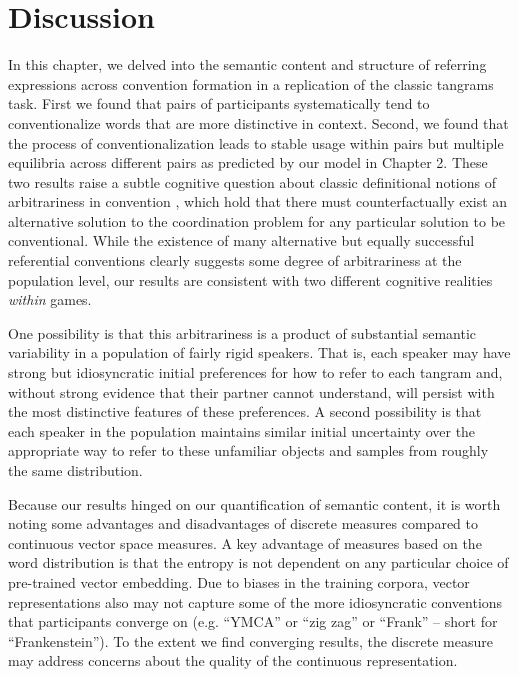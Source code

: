 %


\section{Discussion}\label{general-discussion}

In this chapter, we delved into the semantic content and structure of referring expressions across convention formation in a replication of the classic tangrams task.
First we found that pairs of participants systematically tend to conventionalize words that are more distinctive in context. 
Second, we found that the process of conventionalization leads to stable usage within pairs but multiple equilibria across different pairs as predicted by our model in Chapter 2.
These two results raise a subtle cognitive question about classic definitional notions of arbitrariness in convention \cite{Lewis69_Convention}, which hold that there must counterfactually exist an alternative solution to the coordination problem for any particular solution to be conventional.
While the existence of many alternative but equally successful referential conventions clearly suggests some degree of arbitrariness at the population level, our results are consistent with two different cognitive realities \emph{within} games.

One possibility is that this arbitrariness is a product of substantial semantic variability in a population of fairly rigid speakers.
That is, each speaker may have strong but idiosyncratic initial preferences for how to refer to each tangram and, without strong evidence that their partner cannot understand, will persist with the most distinctive features of these preferences.
A second possibility is that each speaker in the population maintains similar initial uncertainty over the appropriate way to refer to these unfamiliar objects and samples from roughly the same distribution.

Because our results hinged on our quantification of semantic content, it is worth noting some advantages and disadvantages of discrete measures compared to continuous vector space measures.
A key advantage of measures based on the word distribution is that the entropy is not dependent on any particular choice of pre-trained vector embedding. 
Due to biases in the training corpora, vector representations also may not capture some of the more idiosyncratic conventions that participants converge on (e.g. ``YMCA'' or ``zig zag'' or ``Frank'' -- short for ``Frankenstein'').
To the extent we find converging results, the discrete measure may address concerns about the quality of the continuous representation.

